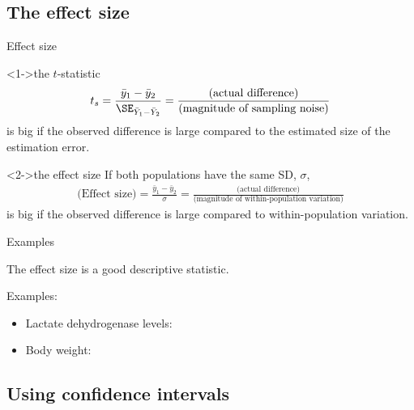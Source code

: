 \subsection{The effect size}

\begin{frame}{Effect size}

    \begin{block}<1->{the $t$-statistic}
        \begin{align*}
            t_s = \frac{\bar y_1 - \bar y_2}{ \SE_{\bar Y_1 - \bar Y_2} } 
            = \frac{ \text{(actual difference)} }{ \text{(magnitude of sampling noise)} }
        \end{align*}
        is big if the observed difference is large compared to the estimated size of the \alert{estimation error}.
    \end{block}

    \begin{block}<2->{the effect size}
        If both populations have the same SD, $\sigma$,
        \begin{align*}
            \text{(Effect size)} = \frac{\bar y_1 - \bar y_2}{ \sigma }
            = \frac{ \text{(actual difference)} }{ \text{(magnitude of within-population variation)} }
        \end{align*}
        is big if the observed difference is large compared to \alert{within-population variation}.
    \end{block}

\end{frame}

\begin{frame}{Examples}

  The \alert{effect size} is a good descriptive statistic.

  \vspace{2em}

  Examples:
  \begin{itemize}
    \item Lactate dehydrogenase levels:
    \item Body weight:
  \end{itemize}

\end{frame}


\subsection{Using confidence intervals}

